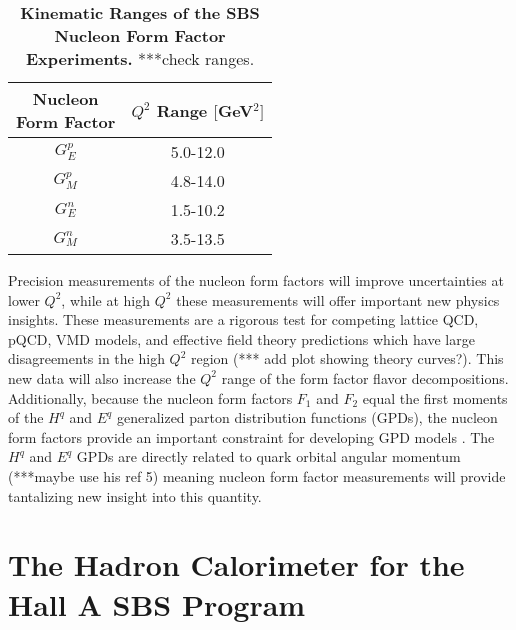 \documentclass[oneside]{book}   %
\newcommand{\q}{$Q^2$\xspace}
\begin{document}
 	\begin{table}[h]
	\centering
	\begin{tabular}{|cc|}
	\hline
	\makecell{Nucleon\\ Form Factor} & \makecell{\q Range\\ $[$GeV$^2]$}\\
	\hline
	$G_E^p$ & 5.0-12.0\\
    $G_M^p$ & 4.8-14.0\\
    $G_E^n$ & 1.5-10.2\\
    $G_M^n$ & 3.5-13.5\\
	\hline
	\end{tabular}
	\caption{{\bf{Kinematic Ranges of the SBS Nucleon Form Factor Experiments.}} ***check ranges.} %
	\label{tab:q2_ranges}
	\end{table}
	
Precision measurements of the nucleon form factors will improve uncertainties at lower \q, while at high \q these measurements will offer important new physics insights. These measurements are a rigorous test for competing lattice QCD, pQCD, VMD models, and effective field theory predictions which have large disagreements in the high \q region (*** add plot showing theory curves?). This new data will also increase the \q range of the form factor flavor decompositions. Additionally, because the nucleon form factors $F_1$ and $F_2$ equal the first moments of the $H^q$ and $E^q$ generalized parton distribution functions (GPDs), the nucleon form factors provide an important constraint for developing GPD models \cite{gen_proposal}. The $H^q$ and $E^q$ GPDs are directly related to quark orbital angular momentum \cite{cisbani_2014}(***maybe use his ref 5) meaning nucleon form factor measurements will provide tantalizing new insight into this quantity. \\ 

 
\chapter{The Hadron Calorimeter for the Hall A SBS Program}
\end{document}

